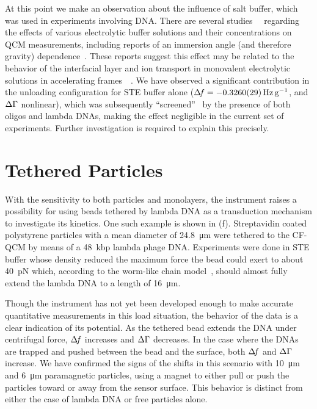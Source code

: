 At this point we make an observation about the influence of salt buffer,
which was used in experiments involving DNA.  There are several
studies~\cite{encarnaccao2007influence}~\cite{lin1995role} regarding the
effects of various electrolytic buffer solutions and their concentrations
on QCM measurements, including reports of an immersion angle (and therefore
gravity) dependence~\cite{yoshimoto2006characteristics}.  These reports
suggest this effect may be related to the behavior of the interfacial layer
and ion transport in monovalent electrolytic solutions in accelerating
frames~\cite{tolman1911electromotive}~\cite{des1893unpolarisirbare}.  We
have observed a significant contribution in the unloading configuration for
STE buffer alone ($\df=\SI{-0.326+-0.0029}{\hertz\per\g}$, and $\Delta\Gamma$
nonlinear), which was subsequently ``screened''~\cite{zhang2002insulating}
by the presence of both oligos and lambda DNAs, making the effect
negligible in the current set of experiments.  Further investigation is
required to explain this precisely.

\section{Tethered Particles}
With the sensitivity to both particles and monolayers, the instrument
raises a possibility for using beads tethered by lambda DNA as a
transduction mechanism to investigate its kinetics.  One such example is
shown in (f).  Streptavidin coated polystyrene
particles with a mean diameter of \SI{24.8}{\micro\meter} were tethered to
the CF-QCM by means of a \SI{48}{kbp} lambda phage DNA.  Experiments were
done in STE buffer whose density reduced the maximum force the bead could
exert to about \SI{40}{\pico\newton} which, according to the worm-like
chain model~\cite{marko1995stretching}, should almost fully extend the
lambda DNA to a length of \SI{16}{\micro\meter}.

Though the instrument has not yet been developed enough to make accurate
quantitative measurements in this load situation, the behavior of the data
is a clear indication of its potential.  As the tethered bead extends the
DNA under centrifugal force, $\Delta\!f$ increases and $\Delta\Gamma$ decreases.  In the
case where the DNAs are trapped and pushed between the bead and the
surface, both $\Delta\!f$ and $\Delta\Gamma$ increase.  We have confirmed the signs of the
shifts in this scenario with \SI{10}{\micro\meter} and \SI{6}{\micro\meter}
paramagnetic particles, using a magnet to either pull or push the
particles toward or away from the sensor surface.  This behavior is
distinct from either the case of lambda DNA or free particles alone.


